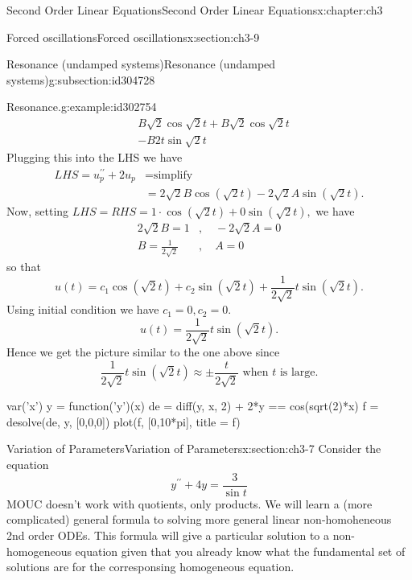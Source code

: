 \documentclass[oneside,10pt,]{book}
\numberwithin{equation}{section}
\numberwithin{equation}{section}
\newcommand{\amp}{&}
\begin{document}
\begin{chapterptx}{Second Order Linear Equations}{}{Second Order Linear Equations}{}{}{x:chapter:ch3}
\begin{sectionptx}{Forced oscillations}{}{Forced oscillations}{}{}{x:section:ch3-9}
\begin{subsectionptx}{Resonance (undamped systems)}{}{Resonance (undamped systems)}{}{}{g:subsection:id304728}
\begin{example}{Resonance.}{g:example:id302754}
\begin{align*}
\amp B\sqrt{2}\cos\sqrt{2}t+B\sqrt{2}\cos\sqrt{2}t\\
\amp -B2t\sin\sqrt{2}t
\end{align*}
Plugging this into the LHS we have%
\begin{align*}
LHS=u_{p}^{\prime\prime}+2u_{p} \amp =\text{simplify}\\
\amp =2\sqrt{2}B\cos\left(\sqrt{2}t\right)-2\sqrt{2}A\sin\left(\sqrt{2}t\right).
\end{align*}
Now, setting \(LHS=RHS=1\cdot\cos\left(\sqrt{2}t\right)+0\sin\left(\sqrt{2}t\right),\) we have%
\begin{align*}
2\sqrt{2}B=1 \amp ,\,\,\,\,\,\,-2\sqrt{2}A=0\\
B=\frac{1}{2\sqrt{2}} \amp ,\,\,\,\,\,\,A=0
\end{align*}
so that%
\begin{equation*}
u(t)=c_{1}\cos\left(\sqrt{2}t\right)+c_{2}\sin\left(\sqrt{2}t\right)+\frac{1}{2\sqrt{2}}t\sin\left(\sqrt{2}t\right).
\end{equation*}
Using initial condition we have \(c_{1}=0,c_{2}=0\).%
\begin{equation*}
u(t)=\frac{1}{2\sqrt{2}}t\sin\left(\sqrt{2}t\right).
\end{equation*}
Hence we get the picture similar to the one above since%
\begin{equation*}
\frac{1}{2\sqrt{2}}t\sin\left(\sqrt{2}t\right)\approx\pm\frac{t}{2\sqrt{2}}\text{ when }t\text{ is large.}
\end{equation*}
%
\begin{sageinput}
var('x')
y = function('y')(x)
de = diff(y, x, 2) + 2*y == cos(sqrt(2)*x)
f = desolve(de, y, [0,0,0])
plot(f, [0,10*pi], title = f)
\end{sageinput}
\end{example}
\end{subsectionptx}
\end{sectionptx}
%
%
\typeout{************************************************}
\typeout{************************************************}
%
\begin{sectionptx}{Variation of Parameters}{}{Variation of Parameters}{}{}{x:section:ch3-7}
Consider the equation%
\begin{equation*}
y^{\prime\prime}+4y =\frac{3}{\sin t}
\end{equation*}
MOUC doesn't work with quotients, only products. We will learn a (more complicated) general formula to solving more general linear non-homoheneous 2nd order ODEs. This formula will give a particular solution to a non-homogeneous equation given that you already know what the fundamental set of solutions are for the corresponsing homogeneous equation.%

\end{sectionptx}
\end{chapterptx}
\end{document}
